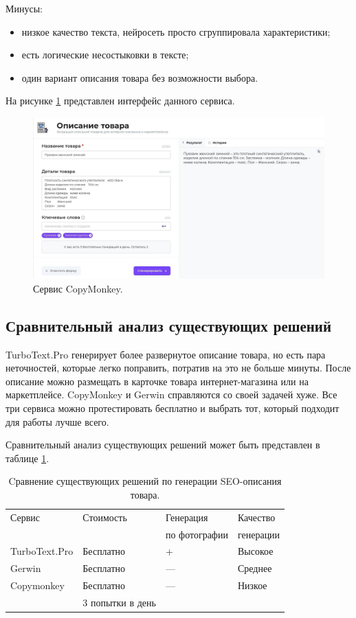 \documentclass[a4paper,12pt]{extarticle}
\begin{document}
Минусы:
\begin{itemize}
	\item низкое качество текста, нейросеть просто сгруппировала характеристики;
	\item есть логические несостыковки в тексте;
	\item один вариант описания товара без возможности выбора.
\end{itemize}

На рисунке \ref{fig:copymonkey} представлен интерфейс данного сервиса.

\begin{figure}[ht]
	\centering
	\includegraphics[scale=0.35]{copymonkey.png}
	\caption{Сервис CopyMonkey.}
	\label{fig:copymonkey}
\end{figure}

\newpage
\subsection{Сравнительный анализ существующих решений}

TurboText.Pro генерирует более развернутое описание товара, но есть пара неточностей, которые легко поправить, потратив на это не больше минуты. После описание можно размещать в карточке товара интернет-магазина или на маркетплейсе. CopyMonkey и Gerwin справляются со своей задачей хуже. Все три сервиса можно протестировать бесплатно и выбрать тот, который подходит для работы лучше всего.

Сравнительный анализ существующих решений может быть представлен в таблице \ref{compare_exist}.

\begin{table}[h]
	\centering
	\begin{tabular}{ | l | l | l | l | }
		\hline
		Сервис & Стоимость & Генерация & Качество \\
		& & по фотографии & генерации \\ \hline
		TurboText.Pro & Бесплатно & + & Высокое  \\ \hline
		Gerwin & Бесплатно & — & Среднее \\ \hline
		Copymonkey & Бесплатно & — & Низкое \\
		& 3 попытки в день &  &  \\ \hline
	\end{tabular}
	\caption{Cравнение существующих решений по генерации SEO-описания товара.}
	\label{compare_exist}
\end{table}
\end{document}
